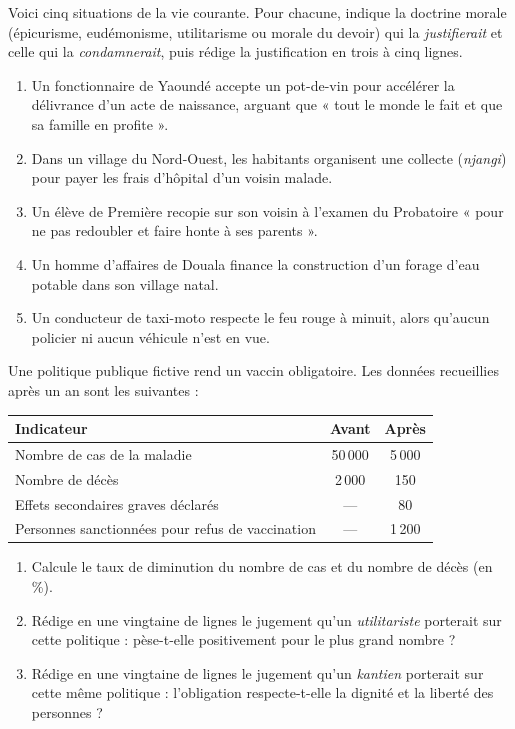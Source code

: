 \documentclass[11pt]{article}
\begin{document}
\begin{exercice}
Voici cinq situations de la vie courante. Pour chacune, indique la doctrine morale (épicurisme, eudémonisme, utilitarisme ou morale du devoir) qui la \emph{justifierait} et celle qui la \emph{condamnerait}, puis rédige la justification en trois à cinq lignes.
\begin{enumerate}
\item Un fonctionnaire de Yaoundé accepte un pot-de-vin pour accélérer la délivrance d'un acte de naissance, arguant que « tout le monde le fait et que sa famille en profite ».
\item Dans un village du Nord-Ouest, les habitants organisent une collecte (\emph{njangi}) pour payer les frais d'hôpital d'un voisin malade.
\item Un élève de Première recopie sur son voisin à l'examen du Probatoire « pour ne pas redoubler et faire honte à ses parents ».
\item Un homme d'affaires de Douala finance la construction d'un forage d'eau potable dans son village natal.
\item Un conducteur de taxi-moto respecte le feu rouge à minuit, alors qu'aucun policier ni aucun véhicule n'est en vue.
\end{enumerate}
\end{exercice}

\begin{exercice}
Une politique publique fictive rend un vaccin obligatoire. Les données recueillies après un an sont les suivantes :
\begin{center}
\begin{tabularx}{\linewidth}{|X|c|c|}
\hline
\rowcolor{popblueL} \textbf{Indicateur} & \textbf{Avant} & \textbf{Après} \\
\hline
Nombre de cas de la maladie & 50\,000 & 5\,000 \\
\hline
Nombre de décès & 2\,000 & 150 \\
\hline
Effets secondaires graves déclarés & --- & 80 \\
\hline
Personnes sanctionnées pour refus de vaccination & --- & 1\,200 \\
\hline
\end{tabularx}
\end{center}
\begin{enumerate}
\item Calcule le taux de diminution du nombre de cas et du nombre de décès (en \%).
\item Rédige en une vingtaine de lignes le jugement qu'un \emph{utilitariste} porterait sur cette politique : pèse-t-elle positivement pour le plus grand nombre ?
\item Rédige en une vingtaine de lignes le jugement qu'un \emph{kantien} porterait sur cette même politique : l'obligation respecte-t-elle la dignité et la liberté des personnes ?
\end{enumerate}
\end{exercice}
\end{document}
